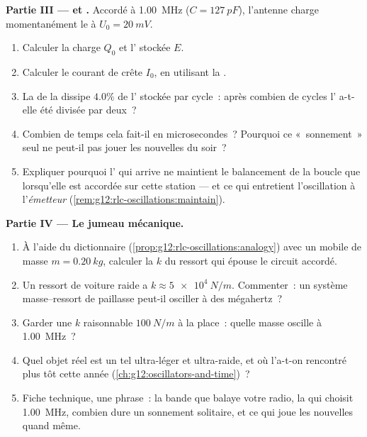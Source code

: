 \begin{problem}
\medskip
\noindent\textbf{Partie III ---  et
.}
Accordé à \qty{1.00}{MHz} ($C = \qty{127}{pF}$), l'antenne charge
momentanément le  à
$U_0 = \qty{20}{mV}$.
\begin{enumerate}[resume]
  \item Calculer la charge $Q_0$ et l'
        stockée $E$.
  \item Calculer le courant de crête $I_0$, en utilisant la
        .
  \item La  de la
         dissipe $4.0\%$ de
        l' stockée par cycle~: après
        combien de cycles l' a-t-elle
        été divisée par deux~?
  \item Combien de temps cela fait-il en microsecondes~? Pourquoi ce
        «~sonnement~» seul ne peut-il pas jouer les nouvelles du
        soir~?
  \item Expliquer pourquoi l' qui arrive ne
        maintient le balancement de la boucle que lorsqu'elle est
        accordée sur cette station --- et ce qui entretient
        l'oscillation à l'\emph{émetteur}
        (\cref{rem:g12:rlc-oscillations:maintain}).
\end{enumerate}

\medskip
\noindent\textbf{Partie IV --- Le jumeau mécanique.}
\begin{enumerate}[resume]
  \item À l'aide du dictionnaire
        (\cref{prop:g12:rlc-oscillations:analogy}) avec un mobile de
        masse $m = \qty{0.20}{kg}$, calculer la
         $k$ du ressort qui épouse le
        circuit accordé.
  \item Un ressort de voiture raide a $k \approx \qty{5e4}{N/m}$.
        Commenter~: un système masse--ressort de paillasse peut-il
        osciller à des mégahertz~?
  \item Garder une $k$ raisonnable $\qty{100}{N/m}$ à la place~:
        quelle masse oscille à \qty{1.00}{MHz}~?
  \item Quel objet réel est un tel
         ultra-léger et
        ultra-raide, et où l'a-t-on rencontré plus tôt cette année
        (\cref{ch:g12:oscillators-and-time})~?
  \item Fiche technique, une phrase~: la bande que balaye votre
        radio, la  qui choisit
        \qty{1.00}{MHz}, combien dure un sonnement solitaire, et ce
        qui joue les nouvelles quand même.
\end{enumerate}
\end{problem}
